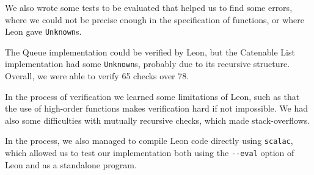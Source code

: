 We also wrote some tests to be evaluated that helped us to find some errors,
where we could not be precise enough in the specification of functions,
or where Leon gave \verb|Unknown|s.

The Queue implementation could be verified by Leon,
but the Catenable List implementation had some \verb|Unknown|s,
probably due to its recursive structure. Overall, we were able to verify 65 checks over 78.

In the process of verification we learned some limitations of Leon,
such as that the use of high-order functions makes verification hard if not impossible.
We had also some difficulties with mutually recursive checks, 
which made stack-overflows.

In the process, we also managed to compile Leon code directly using \verb|scalac|, 
which allowed us to test our implementation both using the \verb|--eval| option of
Leon and as a standalone program.

